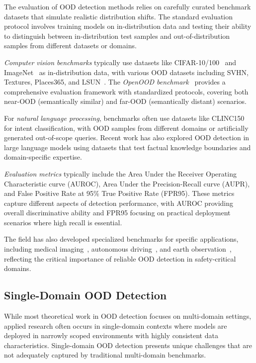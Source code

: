 \documentclass[11pt, oneside]{book}
\theoremstyle{plain}
\theoremstyle{definition}
\theoremstyle{remark}
\begin{document}
The evaluation of OOD detection methods relies on carefully curated benchmark datasets that simulate realistic distribution shifts. The standard evaluation protocol involves training models on in-distribution data and testing their ability to distinguish between in-distribution test samples and out-of-distribution samples from different datasets or domains.

\emph{Computer vision benchmarks} typically use datasets like CIFAR-10/100~\citep{cifar10} and ImageNet~\citep{ILSVRC15} as in-distribution data, with various OOD datasets including SVHN, Textures, Places365, and LSUN~\citep{yang2022openood}. The \emph{OpenOOD benchmark}~\citep{yang2022openood,zhang2023openood} provides a comprehensive evaluation framework with standardized protocols, covering both near-OOD (semantically similar) and far-OOD (semantically distant) scenarios.

For \emph{natural language processing}, benchmarks often use datasets like CLINC150 for intent classification, with OOD samples from different domains or artificially generated out-of-scope queries. Recent work has also explored OOD detection in large language models using datasets that test factual knowledge boundaries and domain-specific expertise.

\emph{Evaluation metrics} typically include the Area Under the Receiver Operating Characteristic curve (AUROC), Area Under the Precision-Recall curve (AUPR), and False Positive Rate at 95\% True Positive Rate (FPR95). These metrics capture different aspects of detection performance, with AUROC providing overall discriminative ability and FPR95 focusing on practical deployment scenarios where high recall is essential.

The field has also developed specialized benchmarks for specific applications, including medical imaging~\citep{zhang2021out}, autonomous driving~\citep{ramanagopal2018failing}, and earth observation~\citep{ekim2024distribution}, reflecting the critical importance of reliable OOD detection in safety-critical domains.

\subsection{Single-Domain OOD Detection}

While most theoretical work in OOD detection focuses on multi-domain settings, applied research often occurs in single-domain contexts where models are deployed in narrowly scoped environments with highly consistent data characteristics. Single-domain OOD detection presents unique challenges that are not adequately captured by traditional multi-domain benchmarks.
\end{document}
